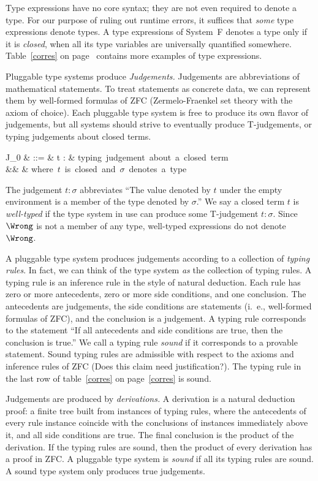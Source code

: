 \documentclass{amsart}
\begin{document}
Type expressions have no core syntax; they are not even required
to denote a type. For our purpose of ruling out runtime errors,
it suffices that \emph{some} type expressions denote types. A
type expressions of System~F denotes a type only if it is
\emph{closed}, when all its type variables are universally
quantified somewhere. Table~\ref{corres} on page~\pageref{corres}
contains more examples of type expressions.

Pluggable type systems produce \emph{Judgements.} Judgements are
abbreviations of mathematical statements. To treat statements as
concrete data, we can represent them by well-formed formulas of
ZFC (Zermelo-Fraenkel set theory with the axiom of choice). Each
pluggable type system is free to produce its own flavor of
judgements, but all systems should strive to eventually produce
T-judgements, or typing judgements about closed terms.
\begin{syntax}
J_0
& ::=
& t : \sigma
   & \mbox{typing judgement about a closed term} \\
&& & \mbox{where $t$ is closed and $\sigma$ denotes a type}
\end{syntax}%
The judgement $t:\sigma$ abbreviates ``The value denoted by $t$
under the empty environment is a member of the type denoted by
$\sigma$.'' We say a closed term $t$ is \emph{well-typed} if the
type system in use can produce some T-judgement $t:\sigma$.
Since $\Wrong$ is not a member of any type, well-typed
expressions do not denote $\Wrong$.

A pluggable type system produces judgements according to a
collection of \emph{typing rules}. In fact, we can think of the
type system \emph{as} the collection of typing rules. A typing
rule is an inference rule in the style of natural deduction. Each
rule has zero or more antecedents, zero or more side conditions,
and one conclusion. The antecedents are judgements, the side
conditions are statements (i.~e., well-formed formulas of ZFC),
and the conclusion is a judgement. A typing rule corresponds to
the statement ``If all antecedents and side conditions are true,
then the conclusion is true.'' We call a typing rule \emph{sound}
if it corresponds to a provable statement. Sound typing rules are
admissible with respect to the axioms and inference rules of ZFC
(Does this claim need justification?). The typing rule in the
last row of table~\ref{corres} on page~\ref{corres} is sound.

Judgements are produced by \emph{derivations.} A derivation is a
natural deduction proof: a finite tree built from instances of
typing rules, where the antecedents of every rule instance
coincide with the conclusions of instances immediately above it,
and all side conditions are true. The final conclusion is the
product of the derivation. If the typing rules are sound, then
the product of every derivation has a proof in ZFC. A pluggable
type system is \emph{sound} if all its typing rules are sound. A
sound type system only produces true judgements.
\end{document}
